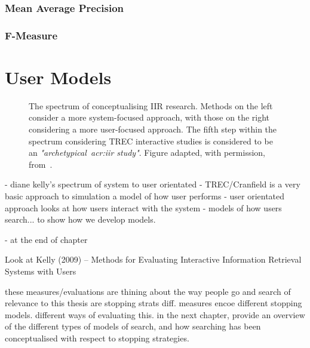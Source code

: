 \subsubsection{Mean Average Precision}

\subsubsection{F-Measure}


\section{User Models}


\begin{figure}[t!]
    \centering
    \caption[The spectrum of conceptualising IIR research~\citep{kelly2009iir}]{The spectrum of conceptualising IIR research. Methods on the left consider a more system-focused approach, with those on the right considering a more user-focused approach. The fifth step within the spectrum considering TREC interactive studies is considered to be an \emph{"archetypical~\gls{acr:iir} study"}. Figure adapted, with permission, from~\cite{kelly2009iir}.}
    \label{fig:spectrum}
\end{figure}

    - diane kelly's spectrum of system to user orientated
        - TREC/Cranfield is a very basic approach to simulation
            a model of how user performs
        - user orientated approach looks at how users interact with the system
        - models of how users search... to show how we develop models.
        
        - at the end of chapter

Look at Kelly (2009) -- Methods for Evaluating Interactive Information Retrieval Systems with Users

these measures/evaluations are thining about the way people go and search
of relevance to this thesis are stopping strats
diff. measures encoe different stopping models. different ways of evaluating this.
in the next chapter, provide an overview of the different types of models of search, and how searching has been conceptualised with respect to stopping strategies.

